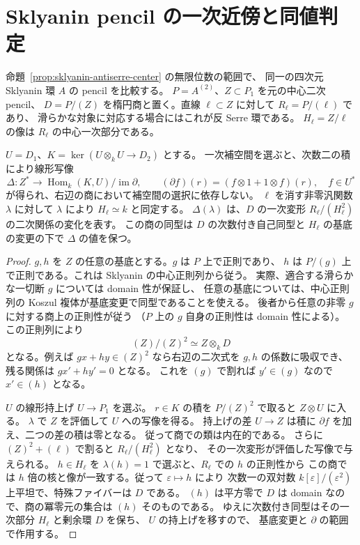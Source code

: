 \section{Sklyanin pencil の一次近傍と同値判定}
\label{sec:pencil-deformation}

命題~\ref{prop:sklyanin-antiserre-center} の無限位数の範囲で、
同一の四次元 Sklyanin 環 $A$ の pencil を比較する。
$P=A^{(2)}$、$Z\subset P_1$ を元の中心二次 pencil、
$D=P/(Z)$ を楕円商と置く。直線 $\ell\subset Z$ に対して $R_\ell=P/(\ell)$ であり、
滑らかな対象に対応する場合にはこれが反 Serre 環である。
$H_\ell=Z/\ell$ の像は $R_\ell$ の中心一次部分である。

\begin{proposition}[中心方向の一次変形]
\label{prop:pencil-tangent}
$U=D_1$、$K=\ker(U\otimes_k U\to D_2)$ とする。
一次補空間を選ぶと、次数二の積により線形写像
\[
 \Delta:Z^*\longrightarrow
 \operatorname{Hom}_k(K,U)/\operatorname{im}\partial,\qquad
 (\partial f)(r)=(f\otimes1+1\otimes f)(r),\quad f\in U^*
\]
が得られ、右辺の商において補空間の選択に依存しない。
$\ell$ を消す非零汎関数 $\lambda$ に対して
$\lambda$ により $H_\ell\simeq k$ と同定する。
$\Delta(\lambda)$ は、$D$ の一次変形 $R_\ell/(H_\ell^2)$ の二次関係の変化を表す。
この商の同型は $D$ の次数付き自己同型と $H_\ell$ の基底の変更の下で
$\Delta$ の値を保つ。
\end{proposition}

\begin{proof}
$g,h$ を $Z$ の任意の基底とする。$g$ は $P$ 上で正則であり、
$h$ は $P/(g)$ 上で正則である。これは Sklyanin の中心正則列から従う。
実際、適合する滑らかな一切断 $g$ については domain 性が保証し、
任意の基底については、中心正則列の Koszul 複体が基底変更で同型であることを使える。
後者から任意の非零 $g$ に対する商上の正則性が従う
（$P$ 上の $g$ 自身の正則性は domain 性による）。
この正則列により
\[
 (Z)/(Z)^2 \simeq Z\otimes_k D
\]
となる。例えば $g x+h y\in (Z)^2$ なら右辺の二次式を
$g,h$ の係数に吸収でき、残る関係は $g x'+h y'=0$ となる。
これを $(g)$ で割れば $y'\in(g)$ なので $x'\in(h)$ となる。

$U$ の線形持上げ $U\to P_1$ を選ぶ。
$r\in K$ の積を $P/(Z)^2$ で取ると $Z\otimes U$ に入る。
$\lambda$ で $Z$ を評価して $U$ への写像を得る。
持上げの差 $U\to Z$ は積に $\partial f$ を加え、二つの差の積は零となる。
従って商での類は内在的である。
さらに $(Z)^2+(\ell)$ で割ると $R_\ell/(H_\ell^2)$ となり、
その一次変形が評価した写像で与えられる。
$h\in H_\ell$ を $\lambda(h)=1$ で選ぶと、$R_\ell$ での $h$ の正則性から
この商では $h$ 倍の核と像が一致する。従って $\varepsilon\mapsto h$ により
次数一の双対数 $k[\varepsilon]/(\varepsilon^2)$ 上平坦で、特殊ファイバーは $D$ である。
$(h)$ は平方零で $D$ は domain なので、商の冪零元の集合は $(h)$ そのものである。
ゆえに次数付き同型はその一次部分 $H_\ell$ と剰余環 $D$ を保ち、
$U$ の持上げを移すので、
基底変更と $\partial$ の範囲で作用する。
\end{proof}

